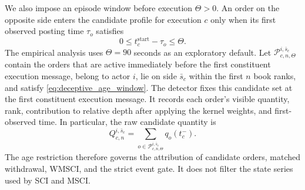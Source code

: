 \documentclass[11pt]{article}
\newenvironment{review}{\begingroup\color{blue}}{\endgroup}
\begin{document}
We also impose \begin{review}an episode window before execution\end{review} $\Theta>0$. \begin{review}An order on the opposite side enters the candidate profile\end{review} for execution
$c$ only when its first observed posting time $\tau_o$ satisfies
\begin{equation}
    0 \leq t_c^{\mathrm{start}}-\tau_o \leq \Theta .
    \label{eq:deceptive_age_window}
\end{equation}
The empirical analysis uses $\Theta=90$ seconds as an exploratory default. Let
$\mathcal{P}^{i,\bar{s}_c}_{c,n,\Theta}$ contain the orders that are active immediately before the first constituent execution message, belong
to actor $i$, lie on side $\bar{s}_c$ within the first $n$ book ranks, and satisfy
\cref{eq:deceptive_age_window}. The detector fixes this candidate set at the first constituent execution message. It records each order's
visible quantity, rank, \begin{review}contribution to relative depth after applying the kernel weights\end{review}, and first-observed time. In particular, the raw
candidate quantity is
\begin{equation}
    Q^{i,\bar{s}_c}_{c,n}
    =
    \sum_{o\in\mathcal{P}^{i,\bar{s}_c}_{c,n,\Theta}} q_o(t_c^{-}).
    \label{eq:age_conditioned_candidate_quantity}
\end{equation}
The age restriction therefore governs \begin{review}the attribution of candidate orders\end{review}, matched withdrawal, WMSCI, and the strict event gate.
It does not filter the state series used by SCI and MSCI.
\end{document}
